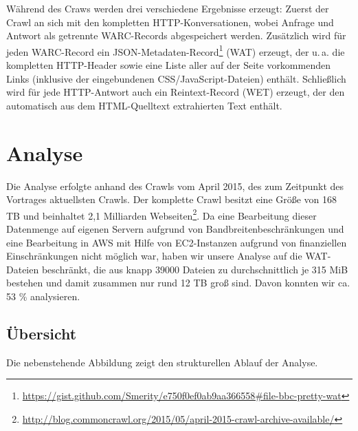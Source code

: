 \documentclass[a4paper,12pt,titlepage=false]{scrreprt}
\begin{document}
Während des Craws werden drei verschiedene Ergebnisse erzeugt: Zuerst der Crawl an sich mit den kompletten HTTP-Konversationen, wobei Anfrage und Antwort als getrennte WARC-Records abgespeichert werden. Zusätzlich wird für jeden WARC-Record ein JSON-Metadaten-Record\footnote{\url{https://gist.github.com/Smerity/e750f0ef0ab9aa366558\#file-bbc-pretty-wat}} (WAT) erzeugt, der u.\,a. die kompletten HTTP-Header sowie eine Liste aller auf der Seite vorkommenden Links (inklusive der eingebundenen CSS/JavaScript-Dateien) enthält. Schließlich wird für jede HTTP-Antwort auch ein Reintext-Record (WET) erzeugt, der den automatisch aus dem HTML-Quelltext extrahierten Text enthält.


\chapter{Analyse}

Die Analyse erfolgte anhand des Crawls vom April 2015, des zum Zeitpunkt des
Vortrages aktuellsten Crawls. Der komplette Crawl besitzt eine Größe von 168 TB und beinhaltet 2,1 Milliarden Webseiten\footnote{\url{http://blog.commoncrawl.org/2015/05/april-2015-crawl-archive-available/}}.
Da eine Bearbeitung dieser Datenmenge auf eigenen Servern aufgrund von
Bandbreitenbeschränkungen und eine Bearbeitung in AWS mit Hilfe von EC2-Instanzen
aufgrund von finanziellen Einschränkungen nicht möglich war, haben wir unsere
Analyse auf die WAT-Dateien beschränkt, die aus knapp 39000 Dateien zu
durchschnittlich je 315 MiB bestehen und damit zusammen nur rund 12 TB groß sind.
Davon konnten wir ca. 53 \% analysieren.

\section{Übersicht}

\begin{figure}
\label{wrap-fig:1}
\end{figure}

Die nebenstehende Abbildung zeigt den strukturellen Ablauf der Analyse.
\end{document}
